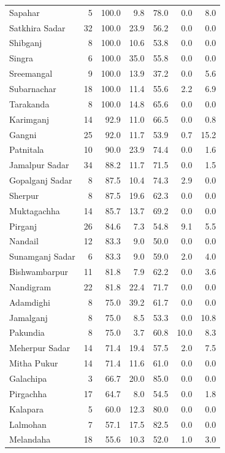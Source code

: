 \begin{longtable}{lrrrrrr}
Sapahar & 5 & 100.0 & 9.8 & 78.0 & 0.0 & 8.0 \\
Satkhira Sadar & 32 & 100.0 & 23.9 & 56.2 & 0.0 & 0.0 \\
Shibganj & 8 & 100.0 & 10.6 & 53.8 & 0.0 & 0.0 \\
Singra & 6 & 100.0 & 35.0 & 55.8 & 0.0 & 0.0 \\
Sreemangal & 9 & 100.0 & 13.9 & 37.2 & 0.0 & 5.6 \\
Subarnachar & 18 & 100.0 & 11.4 & 55.6 & 2.2 & 6.9 \\
Tarakanda & 8 & 100.0 & 14.8 & 65.6 & 0.0 & 0.0 \\
Karimganj & 14 & 92.9 & 11.0 & 66.5 & 0.0 & 0.8 \\
Gangni & 25 & 92.0 & 11.7 & 53.9 & 0.7 & 15.2 \\
Patnitala & 10 & 90.0 & 23.9 & 74.4 & 0.0 & 1.6 \\
Jamalpur Sadar & 34 & 88.2 & 11.7 & 71.5 & 0.0 & 1.5 \\
Gopalganj Sadar & 8 & 87.5 & 10.4 & 74.3 & 2.9 & 0.0 \\
Sherpur & 8 & 87.5 & 19.6 & 62.3 & 0.0 & 0.0 \\
Muktagachha & 14 & 85.7 & 13.7 & 69.2 & 0.0 & 0.0 \\
Pirganj & 26 & 84.6 & 7.3 & 54.8 & 9.1 & 5.5 \\
Nandail & 12 & 83.3 & 9.0 & 50.0 & 0.0 & 0.0 \\
Sunamganj Sadar & 6 & 83.3 & 9.0 & 59.0 & 2.0 & 4.0 \\
Bishwambarpur & 11 & 81.8 & 7.9 & 62.2 & 0.0 & 3.6 \\
Nandigram & 22 & 81.8 & 22.4 & 71.7 & 0.0 & 0.0 \\
Adamdighi & 8 & 75.0 & 39.2 & 61.7 & 0.0 & 0.0 \\
Jamalganj & 8 & 75.0 & 8.5 & 53.3 & 0.0 & 10.8 \\
Pakundia & 8 & 75.0 & 3.7 & 60.8 & 10.0 & 8.3 \\
Meherpur Sadar & 14 & 71.4 & 19.4 & 57.5 & 2.0 & 7.5 \\
Mitha Pukur & 14 & 71.4 & 11.6 & 61.0 & 0.0 & 0.0 \\
Galachipa & 3 & 66.7 & 20.0 & 85.0 & 0.0 & 0.0 \\
Pirgachha & 17 & 64.7 & 8.0 & 54.5 & 0.0 & 1.8 \\
Kalapara & 5 & 60.0 & 12.3 & 80.0 & 0.0 & 0.0 \\
Lalmohan & 7 & 57.1 & 17.5 & 82.5 & 0.0 & 0.0 \\
Melandaha & 18 & 55.6 & 10.3 & 52.0 & 1.0 & 3.0 \\

\end{longtable}
